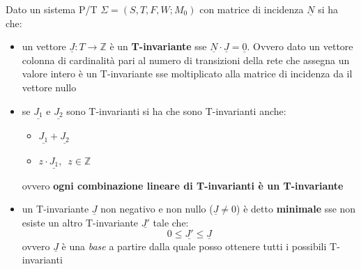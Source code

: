 \documentclass[a4paper,12pt, oneside]{book}
\begin{document}
\begin{definizione}
  Dato un sistema P/T $\Sigma=(S,T,F,W;M_0)$ con matrice di incidenza
  $\underline{N}$ si ha che:
  \begin{itemize}
    \item un vettore $\underline{J}:T\to\mathbb{Z}$ è un \textbf{T-invariante}
    sse $\underline{N}\cdot\underline{J}=\underline{0}$. Ovvero dato un vettore
    colonna di cardinalità pari al numero di transizioni della rete che assegna
    un valore intero è un T-invariante sse moltiplicato alla matrice di
    incidenza da il vettore nullo
    \item se $\underline{J_1}$ e $\underline{J_2}$ sono T-invarianti si ha che
    sono T-invarianti anche: 
    \begin{itemize}
      \item $\underline{J_1}+\underline{J_2}$
      \item $z\cdot\underline{J_1},\,\,\,z\in \mathbb{Z}$
    \end{itemize}
    ovvero \textbf{ogni combinazione lineare di T-invarianti è un T-invariante}
    \item un T-invariante $\underline{J}$ non negativo e non nullo
    ($\underline{J}\neq 0$) è detto \textbf{minimale} sse non esiste un altro
    T-invariante $\underline{J'}$ tale che:
    \[0\leq \underline{J'}\leq \underline{J}\]
    ovvero $\underline{J}$ è una \emph{base} a partire dalla quale posso
    ottenere tutti i possibili T-invarianti
  \end{itemize}
\end{definizione}
\end{document}
